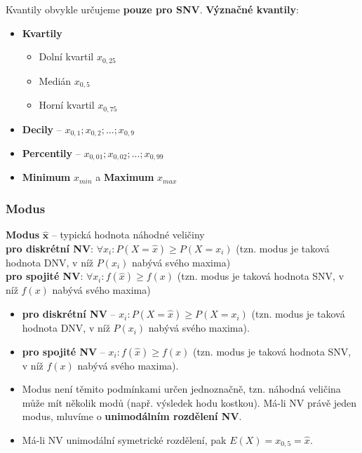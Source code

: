 \noindent Kvantily obvykle určujeme \textbf{pouze pro SNV}. \textbf{Význačné kvantily}:
\begin{itemize}
	\item \textbf{Kvartily}
	\begin{itemize}
		\item[] Dolní kvartil $x_{0,25}$
		\item[] Medián $x_{0,5}$
		\item[] Horní kvartil $x_{0,75}$
	\end{itemize}
	\item \textbf{Decily} -- $x_{0,1}; x_{0,2}; ... ;x_{0,9}$
	\item \textbf{Percentily} -- $x_{0,01}; x_{0,02}; ... ;x_{0,99}$
	\item \textbf{Minimum} $x_{min}$ a \textbf{Maximum} $x_{max}$
\end{itemize}

\subsubsection{Modus}
\textbf{Modus} $\mathbf{\hat{x}}$ -- typická hodnota náhodné veličiny \\ 
\textbf{pro diskrétní NV}: $\forall x_i: P(X = \hat{x}) \geq P(X = x_i)$ (tzn. modus je taková hodnota DNV, v níž $P(x_i)$ nabývá svého maxima) \\
\textbf{pro spojité NV}: $\forall  x_i: f(\hat{x}) \geq f(x)$ (tzn. modus je taková hodnota SNV, v níž $f(x)$ nabývá svého maxima)
\begin{itemize}
\item \textbf{pro diskrétní NV} -- $x_i: P(X = \hat{x}) \geq P(X = x_i)$ (tzn. modus je taková hodnota DNV, v níž $P(x_i)$ nabývá svého maxima).
\item \textbf{pro spojité NV} -- $ x_i: f(\hat{x}) \geq f(x)$ (tzn. modus je taková hodnota SNV, v níž $f(x)$ nabývá svého maxima).
	\item Modus není těmito podmínkami určen jednoznačně, tzn. náhodná veličina může mít několik modů (např. výsledek hodu kostkou). Má-li NV právě jeden modus, mluvíme o \textbf{unimodálním rozdělení NV}.
	\item Má-li NV unimodální symetrické rozdělení, pak $E(X) = x_{0,5} = \hat{x}$.
\end{itemize}

